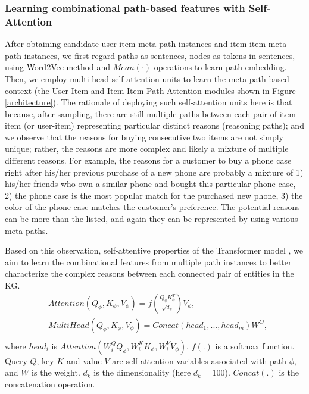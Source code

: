 \subsubsection{\textbf{Learning combinational path-based features with Self-Attention}}
\label{subsubsec3.3.1}
After obtaining candidate user-item meta-path instances and item-item meta-path instances, we first regard paths as sentences, nodes as tokens in sentences, using Word2Vec\cite{mikolov2013efficient} method and $Mean(\cdot)$ operations to learn path embedding. Then, we employ multi-head self-attention units to learn the meta-path based context (the User-Item and Item-Item Path Attention modules shown in Figure \ref{architecture}). The rationale of deploying such self-attention units here is that because, after sampling, there are still multiple paths between each pair of item-item (or user-item) representing particular distinct reasons (reasoning paths); and we observe that the reasons for buying consecutive two items are not simply unique; rather, the reasons are more complex and likely a mixture of multiple different reasons. For example, the reasons for a customer to buy a phone case right after his/her previous purchase of a new phone are probably a mixture of 1) his/her friends who own a similar phone and bought this particular phone case, 2) the phone case is the most popular match for the purchased new phone, 3) the color of the phone case matches the customer's preference. The potential reasons can be more than the listed, and again they can be represented by using various meta-paths.

Based on this observation, self-attentive properties of the Transformer model \cite{vaswani2017attention}, we aim to learn the combinational features from multiple path instances to better characterize the complex reasons between each connected pair of entities in the KG. 
\begin{equation}
	\begin{split}
		&Attention (Q_{\phi},K_{\phi},V_{\phi})=f(\frac{Q_{\phi}K_{\phi}^T}{\sqrt{d_k}})V_{\phi}, \\
		&MultiHead (Q_{\phi},K_{\phi},V_{\phi})=Concat (head_1,...,head_m)W^O , \\
	\end{split}
\end{equation}
where $ head_i $ is $ Attention (W_i^QQ_{\phi},W_i^KK_{\phi},W_i^VV_{\phi}). $ $f(.)$ is a softmax function. Query $Q$, key $K$ and value $V$ are self-attention variables associated with path $\phi$, and $W$ is the weight. $d_k$ is the dimensionality (here $d_k = 100$). $Concat(.)$ is the concatenation operation.



